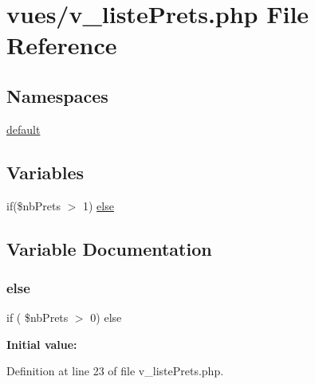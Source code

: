 \hypertarget{v__liste_prets_8php}{}\section{vues/v\+\_\+liste\+Prets.php File Reference}
\label{v__liste_prets_8php}
\subsection*{Namespaces}
\begin{DoxyCompactItemize}
\item 
 \hyperlink{namespacedefault}{default}
\end{DoxyCompactItemize}
\subsection*{Variables}
\begin{DoxyCompactItemize}
\item 
if(\$nb\+Prets $>$ 1) \hyperlink{v__liste_prets_8php_a75b7634f81be217e4772e03e9c00bd5b}{else}
\end{DoxyCompactItemize}


\subsection{Variable Documentation}
\mbox{\label{v__liste_prets_8php_a75b7634f81be217e4772e03e9c00bd5b}} 
\subsubsection{\texorpdfstring{else}{else}}
{\footnotesize\ttfamily if ( \$nb\+Prets $>$ 0) else}

{\bfseries Initial value\+:}


Definition at line 23 of file v\+\_\+liste\+Prets.\+php.

